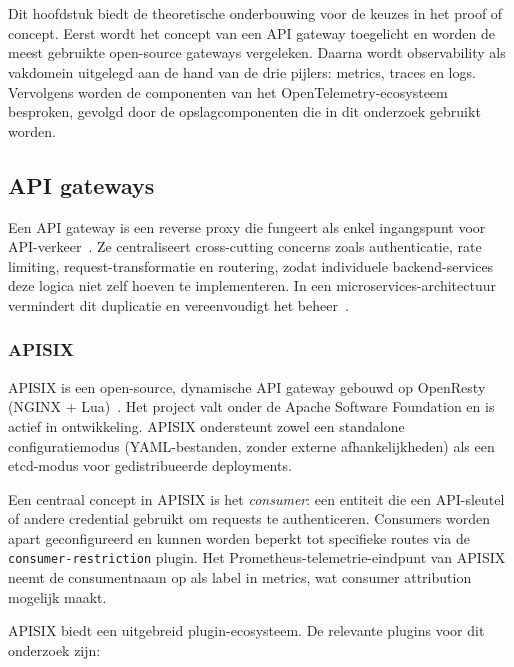 \chapter{}%
\label{ch:stand-van-zaken}

Dit hoofdstuk biedt de theoretische onderbouwing voor de keuzes in het proof of concept. Eerst wordt het concept van een API gateway toegelicht en worden de meest gebruikte open-source gateways vergeleken. Daarna wordt observability als vakdomein uitgelegd aan de hand van de drie pijlers: metrics, traces en logs. Vervolgens worden de componenten van het OpenTelemetry-ecosysteem besproken, gevolgd door de opslagcomponenten die in dit onderzoek gebruikt worden.

\section{API gateways}%
\label{sec:api-gateways}

Een API gateway is een reverse proxy die fungeert als enkel ingangspunt voor API-verkeer~\autocite{NginxAPIGateway2024}. Ze centraliseert cross-cutting concerns zoals authenticatie, rate limiting, request-transformatie en routering, zodat individuele backend-services deze logica niet zelf hoeven te implementeren. In een microservices-architectuur vermindert dit duplicatie en vereenvoudigt het beheer~\autocite{Richardson2018}.

\subsection{APISIX}

APISIX is een open-source, dynamische API gateway gebouwd op OpenResty (NGINX + Lua)~\autocite{APISIX2024}. Het project valt onder de Apache Software Foundation en is actief in ontwikkeling. APISIX ondersteunt zowel een standalone configuratiemodus (YAML-bestanden, zonder externe afhankelijkheden) als een etcd-modus voor gedistribueerde deployments.

Een centraal concept in APISIX is het \textit{consumer}: een entiteit die een API-sleutel of andere credential gebruikt om requests te authenticeren. Consumers worden apart geconfigureerd en kunnen worden beperkt tot specifieke routes via de \texttt{consumer-restriction} plugin. Het Prometheus-telemetrie-eindpunt van APISIX neemt de consumentnaam op als label in metrics, wat consumer attribution mogelijk maakt.

APISIX biedt een uitgebreid plugin-ecosysteem. De relevante plugins voor dit onderzoek zijn:

